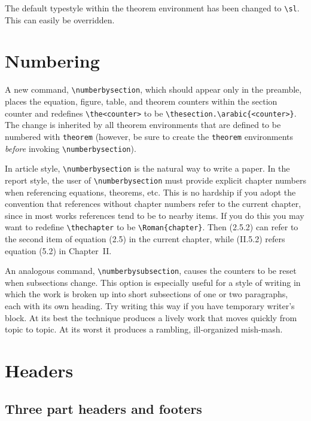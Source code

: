 The default typestyle within the theorem environment has been
changed to \verb|\sl|.  This can easily be overridden.

\section{Numbering}

A new command, \verb|\numberbysection|, which should appear only in
the preamble, places the equation, figure, table, and theorem counters
within the section counter and redefines \verb|\the<counter>| to be
\verb|\thesection.\arabic{<counter>}|.  The change is inherited by all
theorem environments that are defined to be numbered with
\verb|theorem| (however, be sure to create the \verb|theorem|
environments {\it before} invoking \verb|\numberbysection|).

In article style, \verb|\numberbysection| is the natural way to
write a paper.  In the report style, the user of
\verb|\numberbysection| must provide explicit chapter numbers
when referencing equations, theorems, etc.  This is no hardship
if you adopt the convention that references without chapter
numbers refer to the current chapter, since in most works
references tend to be to nearby items.  If you do this you may
want to redefine \verb|\thechapter| to be
\verb|\Roman{chapter}|.  Then (2.5.2) can refer to the second
item of equation (2.5) in the current chapter, while (II.5.2)
refers equation (5.2) in Chapter~II.

An analogous command, \verb|\numberbysubsection|, causes the
counters to be reset when subsections change.  This option is
especially useful for a style of writing in which the work is
broken up into short subsections of one or two paragraphs, each
with its own heading.  Try writing this way if you have
temporary writer's block.  At its best the technique produces a
lively work that moves quickly from topic to topic.  At its
worst it produces a rambling, ill-organized mish-mash.

\section{Headers}

\subsection{Three part headers and footers}

